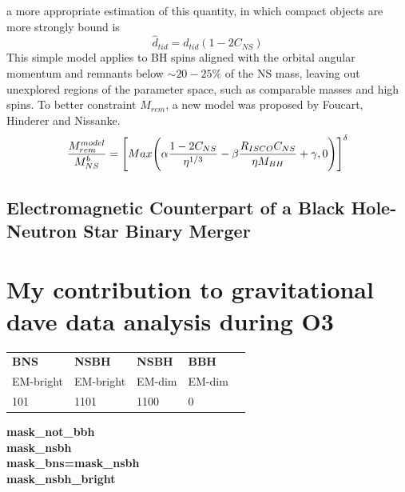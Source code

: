 \documentclass[binding=0.6cm, LaM]{sapthesis}
\begin{document}
        a more appropriate estimation of this quantity, in which compact objects are more strongly bound is
                \begin{equation}
                        \hat{d}_{tid} = d_{tid} (1 - 2C_{NS})
                \end{equation}
        This simple model applies to BH spins aligned with the orbital angular momentum and remnants below
        $\sim 20-25\%$ of the NS mass, leaving out unexplored regions of the parameter space,
        such as comparable masses and high spins.
        To better constraint $M_{rem}$, a new model was proposed by Foucart, Hinderer and Nissanke.
                \begin{equation}
                        {{M_{rem}^{model}} \over {M^b_{NS}}} = \Bigg[ Max \Bigg( \alpha{{1 - 2C_{NS}} \over {\eta^{1/3}}} - \beta {{R_{ISCO}C_{NS}} \over{\eta M_{BH}}} + \gamma, 0 \Bigg)\Bigg]^{\delta}
                \end{equation}



\section{Electromagnetic Counterpart of a Black Hole-Neutron Star Binary Merger}


\chapter{My contribution to gravitational dave data analysis during O3}

\begin{table}[]
\begin{tabular}{|l|l|l|l|l|} \hline
\textbf{BNS}  & \textbf{NSBH}       & \textbf{NSBH}    & \textbf{BBH}     \\ 
EM-bright     & EM-bright  & EM-dim  & EM-dim  \\\hline
{\color{red}1}0{\color{green}1}  & {\color{red}1}1{\color{green}0}{\color{blue}1}  & {\color{red}1}1{\color{green}0}{\color{blue}0}  & {\color{red}0}  \\ \hline
\end{tabular}
\end{table}

\textbf{{\color{red}mask\_not\_bbh} \\
mask\_nsbh \\
{\color{green}mask\_bns}=mask\_nsbh \\
{\color{blue}mask\_nsbh\_bright} \\
}
\end{document}
